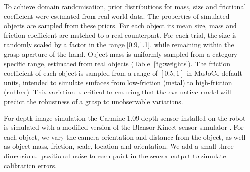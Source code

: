 To achieve domain randomisation, prior distributions for mass, size and frictional coefficient were estimated from real-world data. The properties of simulated objects are sampled from these priors. For each object its mean size, mass and friction coefficient are matched to a real counterpart. For each trial, the size is randomly scaled by a factor in the range [0.9,1.1], while remaining within the grasp aperture of the hand. Object mass is uniformly sampled from a category specific range, estimated from real objects (Table~\ref{fig:weights}). The friction coefficient of each object is sampled from a range of $[0.5, 1]$ in MuJoCo default units, intended to simulate surfaces from low-friction (metal) to high-friction (rubber). This variation is critical to ensuring that the evaluative model will predict the robustness of a grasp to unobservable variations.
\begin{table}[]
\centering
\caption{Mass ranges for each object class (grams).}
\label{fig:weights}
\end{table}
 
For depth image simulation the Carmine 1.09 depth sensor installed on the robot is simulated with a modified version of the Blensor Kinect sensor simulator \cite{KinectSimulator}. For each object, we vary the camera orientation and distance from the object, as well as object mass, friction, scale, location and orientation. We add a small three-dimensional positional noise to each point in the sensor output to simulate calibration errors.

